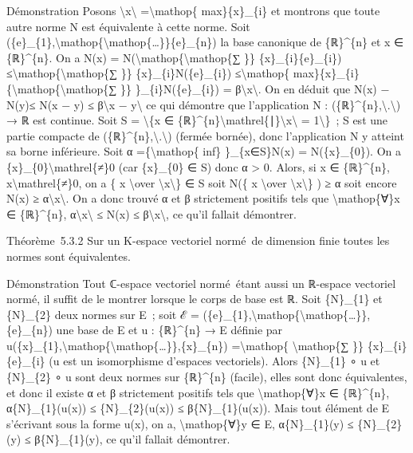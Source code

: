 \documentclass[]{article}
\begin{document}
Démonstration Posons
\textbackslash{}\textbar{}x\textbackslash{}\textbar{}
=\textbackslash{}mathop\{ max\}\textbar{}\{x\}\_\{i\}\textbar{} et
montrons que toute autre norme N est équivalente à cette norme. Soit
(\{e\}\_\{1\},\textbackslash{}mathop\{\textbackslash{}mathop\{\ldots{}\}\}\{e\}\_\{n\})
la base canonique de \{ℝ\}\^{}\{n\} et x ∈ \{ℝ\}\^{}\{n\}. On a N(x) =
N(\textbackslash{}mathop\{\textbackslash{}mathop\{∑ \}\}
\{x\}\_\{i\}\{e\}\_\{i\})
≤\textbackslash{}mathop\{\textbackslash{}mathop\{∑ \}\}
\textbar{}\{x\}\_\{i\}\textbar{}N(\{e\}\_\{i\})
≤\textbackslash{}mathop\{
max\}\textbar{}\{x\}\_\{i\}\textbar{}\{\textbackslash{}mathop\{\textbackslash{}mathop\{∑
\}\} \}\_\{i\}N(\{e\}\_\{i\}) =
β\textbackslash{}\textbar{}x\textbackslash{}\textbar{}. On en déduit que
\textbar{}N(x) − N(y)\textbar{}≤ N(x − y) ≤ β\textbackslash{}\textbar{}x
− y\textbackslash{}\textbar{} ce qui démontre que l'application N :
(\{ℝ\}\^{}\{n\},\textbackslash{}\textbar{}.\textbackslash{}\textbar{}) →
ℝ est continue. Soit S = \textbackslash{}\{x ∈
\{ℝ\}\^{}\{n\}\textbackslash{}mathrel\{∣\}\textbackslash{}\textbar{}x\textbackslash{}\textbar{}
= 1\textbackslash{}\}~; S est une partie compacte de
(\{ℝ\}\^{}\{n\},\textbackslash{}\textbar{}.\textbackslash{}\textbar{})
(fermée bornée), donc l'application N y atteint sa borne inférieure.
Soit α =\{\textbackslash{}mathop\{ inf\} \}\_\{x∈S\}N(x) =
N(\{x\}\_\{0\}). On a \{x\}\_\{0\}\textbackslash{}mathrel\{≠\}0 (car
\{x\}\_\{0\} ∈ S) donc α \textgreater{} 0. Alors, si x ∈ \{ℝ\}\^{}\{n\},
x\textbackslash{}mathrel\{≠\}0, on a \{ x \textbackslash{}over
\textbackslash{}\textbar{}x\textbackslash{}\textbar{}\} ∈ S soit N(\{ x
\textbackslash{}over
\textbackslash{}\textbar{}x\textbackslash{}\textbar{}\} ) ≥ α soit
encore N(x) ≥ α\textbackslash{}\textbar{}x\textbackslash{}\textbar{}. On
a donc trouvé α et β strictement positifs tels que
\textbackslash{}mathop\{∀\}x ∈ \{ℝ\}\^{}\{n\},
α\textbackslash{}\textbar{}x\textbackslash{}\textbar{} ≤ N(x) ≤
β\textbackslash{}\textbar{}x\textbackslash{}\textbar{}, ce qu'il fallait
démontrer.

Théorème~5.3.2 Sur un K-espace vectoriel normé~de dimension finie toutes
les normes sont équivalentes.

Démonstration Tout ℂ-espace vectoriel normé~étant aussi un ℝ-espace
vectoriel normé, il suffit de le montrer lorsque le corps de base est ℝ.
Soit \{N\}\_\{1\} et \{N\}\_\{2\} deux normes sur E~; soit ℰ =
(\{e\}\_\{1\},\textbackslash{}mathop\{\textbackslash{}mathop\{\ldots{}\}\},\{e\}\_\{n\})
une base de E et u : \{ℝ\}\^{}\{n\} → E définie par
u(\{x\}\_\{1\},\textbackslash{}mathop\{\textbackslash{}mathop\{\ldots{}\}\},\{x\}\_\{n\})
=\textbackslash{}mathop\{ \textbackslash{}mathop\{∑ \}\}
\{x\}\_\{i\}\{e\}\_\{i\} (u est un isomorphisme d'espaces vectoriels).
Alors \{N\}\_\{1\} ∘ u et \{N\}\_\{2\} ∘ u sont deux normes sur
\{ℝ\}\^{}\{n\} (facile), elles sont donc équivalentes, et donc il existe
α et β strictement positifs tels que \textbackslash{}mathop\{∀\}x ∈
\{ℝ\}\^{}\{n\}, α\{N\}\_\{1\}(u(x)) ≤ \{N\}\_\{2\}(u(x)) ≤
β\{N\}\_\{1\}(u(x)). Mais tout élément de E s'écrivant sous la forme
u(x), on a, \textbackslash{}mathop\{∀\}y ∈ E, α\{N\}\_\{1\}(y) ≤
\{N\}\_\{2\}(y) ≤ β\{N\}\_\{1\}(y), ce qu'il fallait démontrer.
\end{document}
